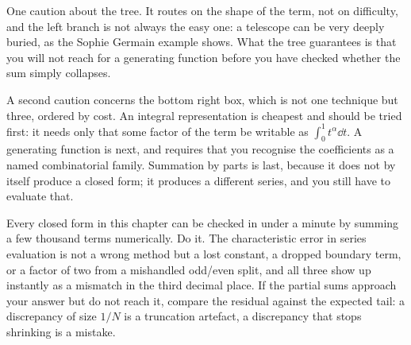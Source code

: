 One caution about the tree. It routes on the shape of the term, not on difficulty, and the left branch is not always the easy one: a telescope can be very deeply buried, as the Sophie Germain example shows. What the tree guarantees is that you will not reach for a generating function before you have checked whether the sum simply collapses.

A second caution concerns the bottom right box, which is not one technique but three, ordered by cost. An integral representation is cheapest and should be tried first: it needs only that some factor of the term be writable as $\int_0^1t^{\alpha}\dd t$. A generating function is next, and requires that you recognise the coefficients as a named combinatorial family. Summation by parts is last, because it does not by itself produce a closed form; it produces a different series, and you still have to evaluate that.

\begin{keynote}
Every closed form in this chapter can be checked in under a minute by summing a few thousand terms numerically. Do it. The characteristic error in series evaluation is not a wrong method but a lost constant, a dropped boundary term, or a factor of two from a mishandled odd/even split, and all three show up instantly as a mismatch in the third decimal place. If the partial sums approach your answer but do not reach it, compare the residual against the expected tail: a discrepancy of size $1/N$ is a truncation artefact, a discrepancy that stops shrinking is a mistake.
\end{keynote}

